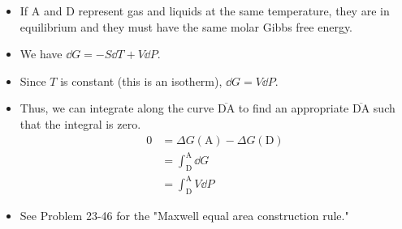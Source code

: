 \documentclass[../notes.tex]{subfiles}
\begin{document}
\begin{itemize}
\begin{itemize}
\begin{itemize}
            \item If A and D represent gas and liquids at the same temperature, they are in equilibrium and they must have the same molar Gibbs free energy.
            \item We have $\dd{G}=-S\dd{T}+V\dd{P}$.
            \item Since $T$ is constant (this is an isotherm), $\dd{G}=V\dd{P}$.
            \item Thus, we can integrate along the curve $\overline{\text{DA}}$ to find an appropriate $\overline{\text{DA}}$ such that the integral is zero.
            \begin{align*}
                0 &= \Delta G(\text{A})-\Delta G(\text{D})\\
                &= \int_\text{D}^\text{A}\dd{G}\\
                &= \int_\text{D}^\text{A}V\dd{P}
            \end{align*}
            \item See Problem 23-46 for the "Maxwell equal area construction rule."
        \end{itemize}
    \end{itemize}
\end{itemize}
\end{document}
